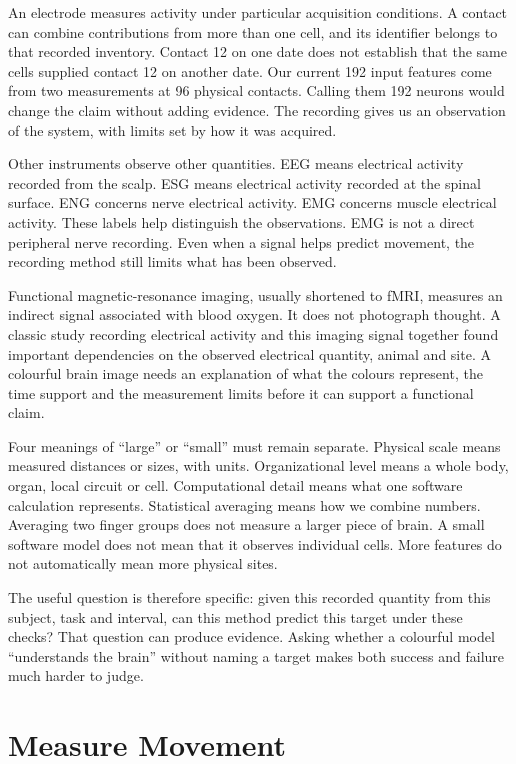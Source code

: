 An electrode measures activity under particular acquisition conditions.
A contact can combine contributions from more than one cell, and its identifier
belongs to that recorded inventory. Contact 12 on one date does not establish
that the same cells supplied contact 12 on another date. Our current 192 input
features come from two measurements at 96 physical contacts. Calling them 192
neurons would change the claim without adding evidence. The recording gives us
an observation of the system, with limits set by how it was acquired.

Other instruments observe other quantities. EEG means electrical activity
recorded from the scalp. ESG means electrical activity recorded at the spinal
surface. ENG concerns nerve electrical activity. EMG concerns muscle electrical
activity. These labels help distinguish the observations. EMG is not a direct
peripheral nerve recording. Even when a signal helps predict movement, the
recording method still limits what has been observed.

Functional magnetic-resonance imaging, usually shortened to fMRI, measures an
indirect signal associated with blood oxygen. It does not photograph thought.
A classic study recording electrical activity and this imaging signal together
found important dependencies on the observed electrical quantity, animal and
site.\cite{logothetis2001} A colourful brain image needs an explanation of what
the colours represent, the time support and the measurement limits before it
can support a functional claim.

Four meanings of ``large'' or ``small'' must remain separate. Physical scale
means measured distances or sizes, with units. Organizational level means a
whole body, organ, local circuit or cell. Computational detail means what one
software calculation represents. Statistical averaging means how we combine
numbers. Averaging two finger groups does not measure a larger piece of brain.
A small software model does not mean that it observes individual cells. More
features do not automatically mean more physical sites.

The useful question is therefore specific: given this recorded quantity from
this subject, task and interval, can this method predict this target under
these checks? That question can produce evidence. Asking whether a colourful
model ``understands the brain'' without naming a target makes both success
and failure much harder to judge.

\section{Measure Movement}

